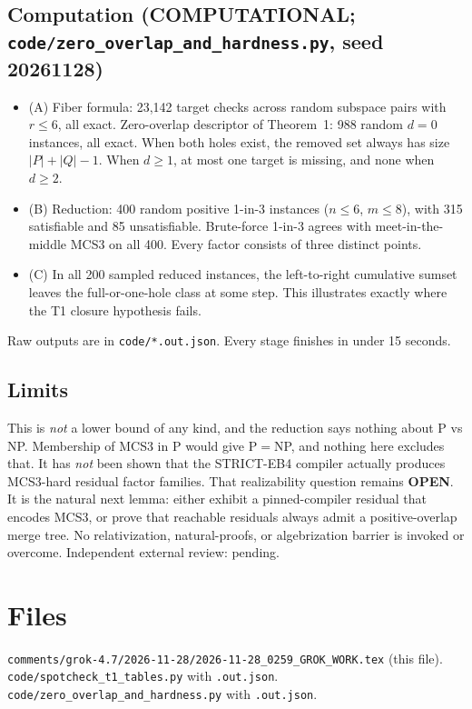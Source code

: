 \documentclass[11pt]{article}
\begin{document}
\subsection*{Computation (COMPUTATIONAL; \texttt{code/zero\_overlap\_and\_hardness.py}, seed 20261128)}
\begin{itemize}
\item[] (A) Fiber formula: 23{,}142 target checks across random subspace pairs with $r\le6$, all exact. Zero-overlap descriptor of Theorem~1: 988 random $d=0$ instances, all exact. When both holes exist, the removed set always has size $|P|+|Q|-1$. When $d\ge1$, at most one target is missing, and none when $d\ge2$.
\item[] (B) Reduction: 400 random positive 1-in-3 instances ($n\le6$, $m\le8$), with 315 satisfiable and 85 unsatisfiable. Brute-force 1-in-3 agrees with meet-in-the-middle MCS3 on all 400. Every factor consists of three distinct points.
\item[] (C) In all 200 sampled reduced instances, the left-to-right cumulative sumset leaves the full-or-one-hole class at some step. This illustrates exactly where the T1 closure hypothesis fails.
\end{itemize}
Raw outputs are in \texttt{code/*.out.json}. Every stage finishes in under 15 seconds.

\subsection*{Limits}
This is \emph{not} a lower bound of any kind, and the reduction says nothing about P vs NP. Membership of MCS3 in P would give P$=$NP, and nothing here excludes that. It has \emph{not} been shown that the STRICT-EB4 compiler actually produces MCS3-hard residual factor families. That realizability question remains \textbf{OPEN}. It is the natural next lemma: either exhibit a pinned-compiler residual that encodes MCS3, or prove that reachable residuals always admit a positive-overlap merge tree. No relativization, natural-proofs, or algebrization barrier is invoked or overcome. Independent external review: pending.

\section*{Files}
\texttt{comments/grok-4.7/2026-11-28/2026-11-28\_0259\_GROK\_WORK.tex} (this file). \texttt{code/spotcheck\_t1\_tables.py} with \texttt{.out.json}. \texttt{code/zero\_overlap\_and\_hardness.py} with \texttt{.out.json}.
\end{document}

